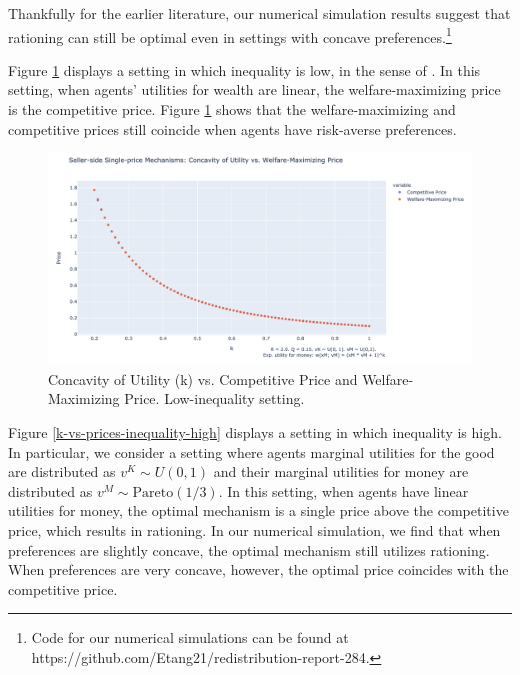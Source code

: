 \documentclass[AER]{AEA}
\begin{document}
Thankfully for the earlier literature, our numerical simulation results suggest that rationing can still be optimal even in settings with concave preferences.\footnote{Code for our numerical simulations can be found at https://github.com/Etang21/redistribution-report-284. }

Figure \ref{k-vs-prices-inequality-low} displays a setting in which inequality is low, in the sense of \cite{dworczak-2020}. In this setting, when agents' utilities for wealth are linear, the welfare-maximizing price is the competitive price. Figure \ref{k-vs-prices-inequality-low} shows that the welfare-maximizing and competitive prices still coincide when agents have risk-averse preferences.

\begin{figure}
    \label{k-vs-prices-inequality-low}
    \includegraphics[width=\textwidth]{figures/k-vs-prices-inequality-low.png}
    \caption{Concavity of Utility (k) vs. Competitive Price and Welfare-Maximizing Price. Low-inequality setting.}
\end{figure}

Figure \ref{k-vs-prices-inequality-high} displays a setting in which inequality is high. In particular, we consider a setting where agents marginal utilities for the good are distributed as $v^K \sim U(0,1)$ and their marginal utilities for money are distributed as $v^M \sim \textrm{Pareto}(1/3)$. In this setting, when agents have linear utilities for money, the optimal mechanism is a single price above the competitive price, which results in rationing. In our numerical simulation, we find that when preferences are slightly concave, the optimal mechanism still utilizes rationing. When preferences are very concave, however, the optimal price coincides with the competitive price.
\end{document}
